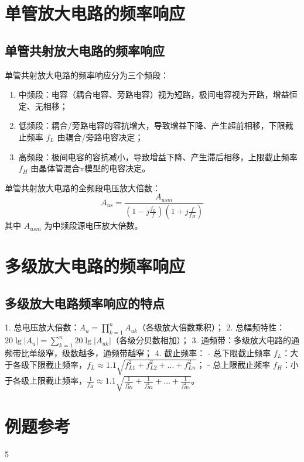 \section{\texorpdfstring{单管放大电路的频率响应}{单管放大电路的频率响应}}
\subsection{\texorpdfstring{单管共射放大电路的频率响应}{单管共射放大电路的频率响应}}
单管共射放大电路的频率响应分为三个频段：
\begin{enumerate}
    \item 中频段：电容（耦合电容、旁路电容）视为短路，极间电容视为开路，增益恒定、无相移；
    \item 低频段：耦合/旁路电容的容抗增大，导致增益下降、产生超前相移，下限截止频率 $f_L$ 由耦合/旁路电容决定；
    \item 高频段：极间电容的容抗减小，导致增益下降、产生滞后相移，上限截止频率 $f_H$ 由晶体管混合$\pi$模型的电容决定。
\end{enumerate}
单管共射放大电路的全频段电压放大倍数：
\[ A_{us} = \frac{A_{usm}}{\left(1 - j\frac{f_L}{f}\right)\left(1 + j\frac{f}{f_H}\right)} \]
其中 $A_{usm}$ 为中频段源电压放大倍数。

\section{\texorpdfstring{多级放大电路的频率响应}{多级放大电路的频率响应}}
\subsection{\texorpdfstring{多级放大电路频率响应的特点}{多级放大电路频率响应的特点}}
1. 总电压放大倍数：$A_u = \prod_{k=1}^n A_{uk}$（各级放大倍数乘积）；
2. 总幅频特性：$20\lg|A_u| = \sum_{k=1}^n 20\lg|A_{uk}|$（各级分贝数相加）；
3. 通频带：多级放大电路的通频带比单级窄，级数越多，通频带越窄；
4. 截止频率：
   - 总下限截止频率 $f_L$：大于各级下限截止频率，$f_L \approx 1.1\sqrt{f_{L1}^2 + f_{L2}^2 + \dots + f_{Ln}^2}$；
   - 总上限截止频率 $f_H$：小于各级上限截止频率，$\frac{1}{f_H} \approx 1.1\sqrt{\frac{1}{f_{H1}^2} + \frac{1}{f_{H2}^2} + \dots + \frac{1}{f_{Hn}^2}}$。

\section{例题参考}
5